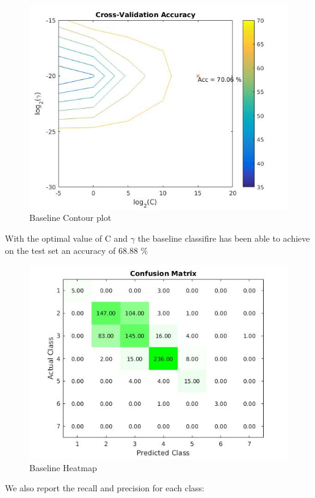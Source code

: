\documentclass[a4paper,10pt]{article}
\begin{document}
      \begin{figure}[H]
	\centering
	\includegraphics[scale=0.5]{baseline.jpg}
	\caption{Baseline Contour plot}
      \end{figure}
      With the optimal value of C and $\gamma$ the baseline classifire has been able to achieve on the test set an accuracy of 68.88 \% \newline
      \begin{figure}[H]
	\centering
	\includegraphics[scale=0.5]{conf_matrix_baseline.jpg}
	\caption{Baseline Heatmap}
      \end{figure}
      \noindent We also report the recall and precision for each class:\newline
      
\end{document}
